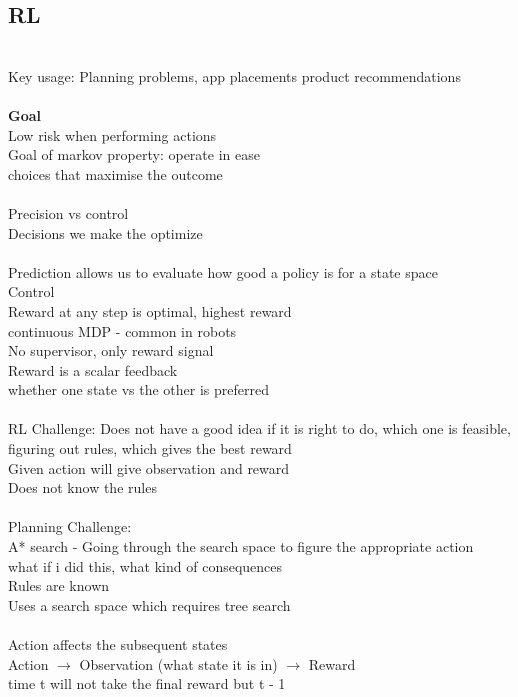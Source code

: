 \documentclass[11pt]{article}
\begin{document}
\subsection*{RL}\\
Key usage: Planning problems, app placements product recommendations\\\\
\textbf{Goal}\\
Low risk when performing actions\\
Goal of markov property: operate in ease\\
choices that maximise the outcome\\
\\
Precision vs control\\
Decisions we make the optimize\\
\\
Prediction allows us to evaluate how good a policy is for a state space\\
Control\\
Reward at any step is optimal, highest reward
\\
continuous MDP - common in robots\\
No supervisor, only reward signal\\
Reward is a scalar feedback\\
whether one state vs the other is preferred\\
\\
RL Challenge: Does not have a good idea if it is right to do, which one is feasible, figuring out rules, which gives the best reward
\\
Given action will give observation and reward\\
Does not know the rules\\
\\
Planning Challenge:\\
A* search - Going through the search space to figure the appropriate action\\
what if i did this, what kind of consequences
\\
Rules are known\\
Uses a search space which requires tree search
\\
\\
Action affects the subsequent states\\
Action $\rightarrow$ Observation (what state it is in) $\rightarrow$  Reward\\
time t will not take the final reward but t - 1\\
\end{document}

